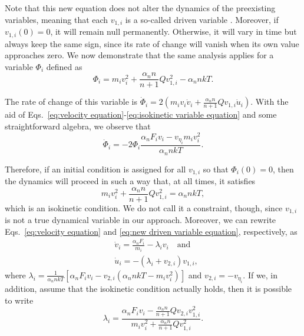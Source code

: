 \documentclass[
aip,
jcp,
reprint,
]{revtex4-1}
\newcommand{\nn}{n}
\begin{document}
Note that this new equation does not alter the dynamics of the preexisting variables, meaning that each $v_{1,i}$ is a so-called driven variable \cite{Tuckerman_1999, Tuckerman_2001a}.
Moreover, if $v_{1,i}(0) = 0$, it will remain null permanently.
Otherwise, it will vary in time but always keep the same sign, since its rate of change will vanish when its own value approaches zero.
We now demonstrate that the same analysis applies for a variable $\Phi_i$ defined as
\begin{equation}
\label{eq:isokinetic variable equation}
\Phi_i = m_i v_i^2 + \frac{\alpha_\nn \nn}{\nn+1} Q v_{1,i}^2 - \alpha_\nn \nn k T.
\end{equation}

The rate of change of this variable is $\dot{\Phi}_i = 2 (m_i v_i \dot{v}_i + \frac{\alpha_\nn \nn}{\nn+1} Q  v_{1,i} \dot{u}_i)$.
With the aid of Eqs.~\eqref{eq:velocity equation}-\eqref{eq:isokinetic variable equation} and some straightforward algebra, we observe that
\begin{equation*}
\dot{\Phi}_i = - 2 \Phi_i \frac{\alpha_\nn F_i v_i - v_{\eta_i} m_i v_i^2}{\alpha_\nn \nn k T}.
\end{equation*}

Therefore, if an initial condition is assigned for all $v_{1,i}$ so that $\Phi_i(0) = 0$, then the dynamics will proceed in such a way that, at all times, it satisfies
\begin{equation}
\label{eq:isokinetic condition}
m_i v_i^2 + \frac{\alpha_\nn \nn}{\nn+1} Q v_{1,i}^2 = \alpha_\nn \nn k T,
\end{equation}
which is an isokinetic condition.
We do not call it a constraint, though, since $v_{1,i}$ is not a true dynamical variable in our approach.
Moreover, we can rewrite Eqs.~\eqref{eq:velocity equation} and \eqref{eq:new driven variable equation}, respectively, as
\begin{subequations}
\label{eq:isokinetic equations of motion}
\begin{align}
&\dot{v}_i = \frac{\alpha_\nn F_i}{m_i} - \lambda_i v_i \quad \mathrm{and} \\
&\dot{u}_i = -(\lambda_i + v_{2,i}) v_{1,i},
\end{align}
\end{subequations}
where $\lambda_i = \frac{1}{\alpha_\nn \nn k T} [\alpha_\nn F_i v_i - v_{2,i} (\alpha_\nn \nn k T - m_i v_i^2)]$ and $v_{2,i} = -v_{\eta_i}$.
If we, in addition, assume that the isokinetic condition actually holds, then it is possible to write
\begin{equation}
\lambda_i = \frac{\alpha_\nn F_i v_i - \frac{\alpha_\nn \nn}{\nn+1} Q v_{2,i} v_{1,i}^2}{m_i v_i^2 + \frac{\alpha_\nn \nn}{\nn+1} Q v_{1,i}^2}.
\end{equation}
\end{document}
